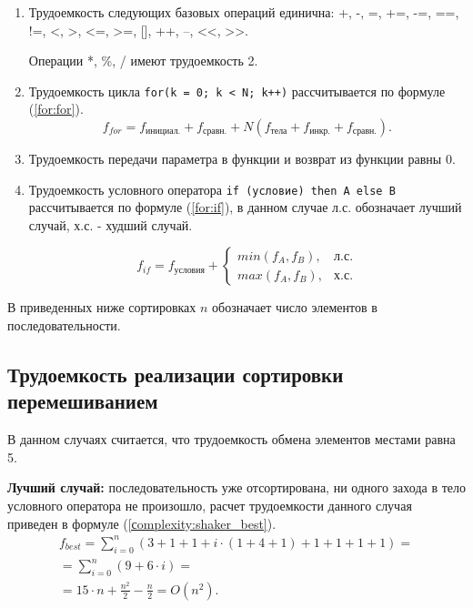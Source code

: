 \begin{enumerate}
	
	\item Трудоемкость следующих базовых операций единична:
	+, -, =, +=, -=, ==, !=, <, >, <=, >=, [], ++, --, <<, >>.
	
	Операции *, \%, / имеют трудоемкость 2.
	
	\item Трудоемкость цикла \texttt{for(k = 0; k < N; k++)}  рассчитывается по формуле (\ref{for:for}).
	\begin{equation}
		\label{for:for}
		f_{for} = f_{\text{инициал.}} + f_{\text{сравн.}} + N(f_{\text{тела}} + f_{\text{инкр.}} + f_{\text{сравн.}}).
	\end{equation}
	
	\item Трудоемкость передачи параметра в функции и возврат из функции равны 0.
	\item Трудоемкость условного оператора \texttt{if (условие) then A else B} рассчитывается по формуле (\ref{for:if}), в данном случае л.с. обозначает лучший случай, х.с. - худший случай.
	
	\begin{equation}
		\label{for:if}
		f_{if} = f_{\text{условия}} +
		\begin{cases}
			min(f_A, f_B), & \text{л.с.}\\
			max(f_A, f_B), & \text{х.с.}
		\end{cases}
	\end{equation}
	
\end{enumerate}


В приведенных ниже сортировках $n$ обозначает число элементов в последовательности.
\subsection{Трудоемкость реализации сортировки перемешиванием}
В данном случаях считается, что трудоемкость обмена элементов местами равна 5.

\textbf{Лучший случай:} последовательность уже отсортирована, ни одного захода в тело условного оператора не произошло, расчет трудоемкости данного случая приведен в формуле (\ref{сomplexity:shaker_best}).
\begin{equation}
	\label{сomplexity:shaker_best}
	\begin{gathered}
		f_{best} =\sum_{i=0}^{n}  (3 +  1 + 1 + i \cdot (1 +4  + 1) + 1 +1 +1 +1) =\\ =\sum_{i=0}^{n} (9 + 6 \cdot i) = \\
		= 15 \cdot n + \frac{n^2}{2} - \frac{n}{2}  = O(n^2).
	\end{gathered}
\end{equation}

